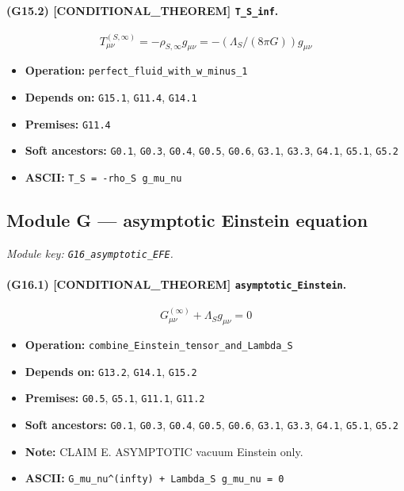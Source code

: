 \documentclass[11pt,a4paper]{article}
\theoremstyle{remark}\newtheorem*{caution}{Caution}
\newcommand{\tagbox}[1]{\textsc{[#1]}}
\begin{document}
\paragraph{(G15.2) \tagbox{CONDITIONAL\_THEOREM} \texttt{T\_S\_inf}.}
\begin{equation}
T^{(S,\infty)}_{\mu\nu}=-\rho_{S,\infty} g_{\mu\nu}=-(\Lambda_S/(8\pi G))g_{\mu\nu}
\tag{G15.2}
\end{equation}
\begin{itemize}\setlength{\itemsep}{0.12em}
\item \textbf{Operation:} \texttt{perfect\_fluid\_with\_w\_minus\_1}
\item \textbf{Depends on:} \texttt{G15.1}, \texttt{G11.4}, \texttt{G14.1}
\item \textbf{Premises:} \texttt{G11.4}
\item \textbf{Soft ancestors:} \texttt{G0.1}, \texttt{G0.3}, \texttt{G0.4}, \texttt{G0.5}, \texttt{G0.6}, \texttt{G3.1}, \texttt{G3.3}, \texttt{G4.1}, \texttt{G5.1}, \texttt{G5.2}
\item \textbf{ASCII:} \texttt{T\_S = -rho\_S g\_mu\_nu}
\end{itemize}
\subsection{Module G --- asymptotic Einstein equation}
\textit{Module key: \texttt{G16\_asymptotic\_EFE}.}
\paragraph{(G16.1) \tagbox{CONDITIONAL\_THEOREM} \texttt{asymptotic\_Einstein}.}
\begin{equation}
G^{(\infty)}_{\mu\nu}+\Lambda_S g_{\mu\nu}=0
\tag{G16.1}
\end{equation}
\begin{itemize}\setlength{\itemsep}{0.12em}
\item \textbf{Operation:} \texttt{combine\_Einstein\_tensor\_and\_Lambda\_S}
\item \textbf{Depends on:} \texttt{G13.2}, \texttt{G14.1}, \texttt{G15.2}
\item \textbf{Premises:} \texttt{G0.5}, \texttt{G5.1}, \texttt{G11.1}, \texttt{G11.2}
\item \textbf{Soft ancestors:} \texttt{G0.1}, \texttt{G0.3}, \texttt{G0.4}, \texttt{G0.5}, \texttt{G0.6}, \texttt{G3.1}, \texttt{G3.3}, \texttt{G4.1}, \texttt{G5.1}, \texttt{G5.2}
\item \textbf{Note:} CLAIM E. ASYMPTOTIC vacuum Einstein only.
\item \textbf{ASCII:} \texttt{G\_mu\_nu^(infty) + Lambda\_S g\_mu\_nu = 0}
\end{itemize}
\end{document}

